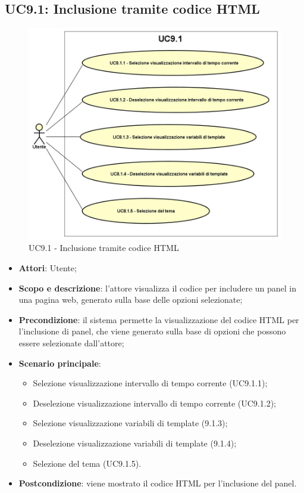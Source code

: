 \subsection{UC9.1: Inclusione tramite codice HTML}
\hypertarget{UC9.1}{}
\begin{figure} [H]
	\centering
	\includegraphics[scale=0.45]{Img/UC9-1}
	\caption{UC9.1 - Inclusione tramite codice HTML}\label{}
\end{figure}
\begin{itemize}
	\item \textbf{Attori}: Utente;
	\item \textbf{Scopo e descrizione}: l'attore visualizza il codice  per includere un panel in una pagina web, generato sulla base delle opzioni selezionate;
	\item \textbf{Precondizione}: il sistema permette la visualizzazione del codice HTML per l'inclusione di panel, che viene generato sulla base di opzioni che possono essere selezionate dall'attore;
	\item \textbf{Scenario principale}:
	\begin{itemize}
		\item Selezione visualizzazione intervallo di tempo corrente (UC9.1.1);
		\item Deselezione visualizzazione intervallo di tempo corrente (UC9.1.2);
		\item Selezione visualizzazione variabili di template (9.1.3);
		\item Deselezione visualizzazione variabili di template (9.1.4);
		\item Selezione del tema (UC9.1.5).
	\end{itemize}
	\item \textbf{Postcondizione}: viene mostrato il codice HTML per l'inclusione del panel.
\end{itemize}

